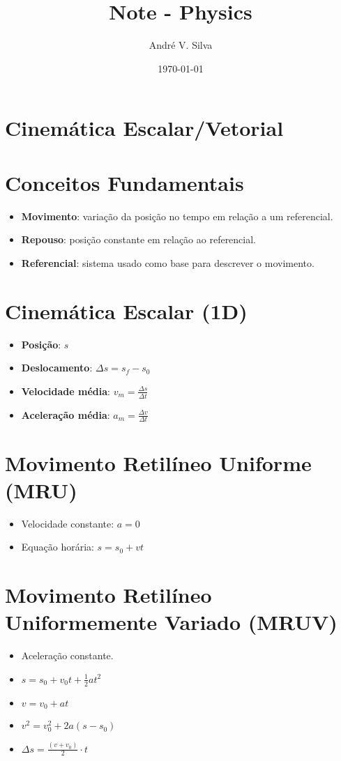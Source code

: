 \documentclass[a4paper,12pt]{article}
\title{ \textbf{\large Note - Physics}}
\author{Andr\'e V. Silva}
\date{\today}
\begin{document}
\justifying

\begin{multicols}{2}

\section{Cinemática Escalar/Vetorial}

\section{Conceitos Fundamentais}
\begin{itemize}
  \item \textbf{Movimento}: variação da posição no tempo em relação a um referencial.
  \item \textbf{Repouso}: posição constante em relação ao referencial.
  \item \textbf{Referencial}: sistema usado como base para descrever o movimento.
\end{itemize}

\section{Cinemática Escalar (1D)}
\begin{itemize}
  \item \textbf{Posição}: $s$
  \item \textbf{Deslocamento}: $\Delta s = s_f - s_0$
  \item \textbf{Velocidade média}: $v_m = \frac{\Delta s}{\Delta t}$
  \item \textbf{Aceleração média}: $a_m = \frac{\Delta v}{\Delta t}$
\end{itemize}

\section{Movimento Retilíneo Uniforme (MRU)}
\begin{itemize}
  \item Velocidade constante: $a = 0$
  \item Equação horária: $s = s_0 + v t$
\end{itemize}

\section{Movimento Retilíneo Uniformemente Variado (MRUV)}
\begin{itemize}
  \item Aceleração constante.
  \item $s = s_0 + v_0 t + \frac{1}{2} a t^2$
  \item $v = v_0 + a t$
  \item $v^2 = v_0^2 + 2a(s - s_0)$
  \item $\Delta s = \frac{(v + v_0)}{2} \cdot t$
\end{itemize}


\end{multicols}
\end{document}
